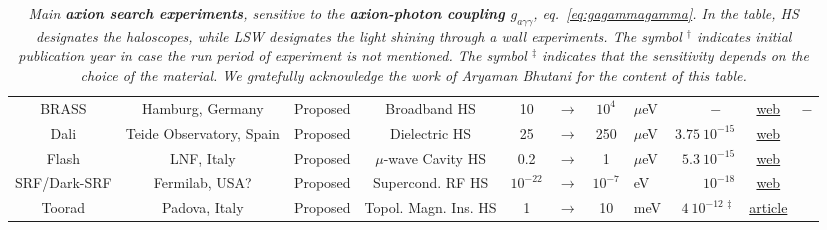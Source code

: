 \begin{table}[!p]
\begin{center}
{\begin{tabular}{ccccccclrcc}
        \rule{0pt}{1ex} 
        {\sc BRASS} & Hamburg, Germany & Proposed & Broadband HS & 10 &$\to$ &$10^{4}$ &$\mu$eV & $-$~~ & \href{https://www.physik.uni-hamburg.de/iexp/gruppe-horns/forschung/brass.html}{web} & $-$
        \\

        \rule{0pt}{1ex}
        {\sc Dali} & Teide Observatory, Spain & Proposed & Dielectric HS & 25 &$\to$ &250 &$\mu$eV & $3.75 \ 10^{-15}$ & \href{https://www.iac.es/en/projects/dalipop-pioneering-tunable-broad-band-search-axion-dark-matter-above-25-mev}{web}  &\cite{DALI} 
        \\

        \rule{0pt}{1ex}
        {\sc Flash} & LNF, Italy & Proposed & $\mu$-wave Cavity HS & 0.2 &$\to$ & 1 &$\mu$eV & $5.3\ 10^{-15}$ & \href{https://coldlab.lnf.infn.it/experiments/klash/}{web}  & \cite{KFLASH}
        \\

        \rule{0pt}{1ex}
        {\sc SRF/Dark-SRF} & Fermilab, USA? & Proposed & Supercond. RF HS & $10^{-22}$ &$\to$ & $10^{-7}$ & eV & $10^{-18}$ & \href{https://news.fnal.gov/tag/srf/}{web} & \cite{SRF}
        \\

        \rule{0pt}{1ex}
        {\sc Toorad} & Padova, Italy & Proposed & Topol. Magn. Ins. HS & 1 &$\to$ & 10 & meV &$ 4\ 10^{-12\, \ddagger}$ & \href{https://researchoutreach.org/articles/searching-axions-revealing-dark-matter-particle/}{article} & \cite{TOORAD}
        \\

        \hline\hline
      \end{tabular}}
  \end{center}
  \caption[Main axion-photon experiments]{\label{tab:AxionPhotonexp}\em Main {\bfseries axion search experiments}, sensitive to the {\bfseries axion-photon coupling $g_{a\gamma\gamma}$}, eq.~\eqref{eq:gagammagamma}. In the table, HS designates the {\em haloscopes}, while LSW designates the {\em light shining through a wall} experiments. The symbol $^\dagger$ indicates initial publication year in case the run period of experiment is not mentioned. The symbol $^\ddagger$ indicates that the sensitivity depends on the choice of the material. 
 We gratefully acknowledge the work of Aryaman Bhutani for the content of this table.
 }

\end{table}


